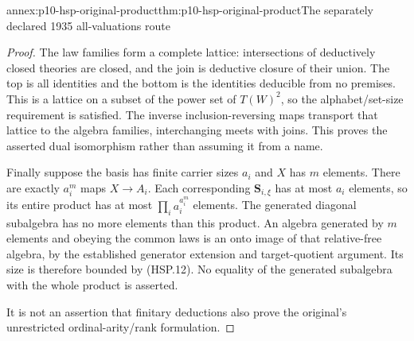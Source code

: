 \begin{annexitem}{annex:p10-hsp-original-product}{thm:p10-hsp-original-product}{The separately declared 1935 all-valuations route}
\begin{proof}
The law families form a complete lattice: intersections
of deductively closed theories are closed, and the
join is deductive closure of their union. The top
is all identities and the bottom is the identities
deducible from no premises. This is a lattice on
a subset of the power set of \(T(W)^2\), so the
alphabet/set-size requirement is satisfied.
The inverse inclusion-reversing maps transport that
lattice to the algebra families, interchanging
meets with joins. This proves the asserted dual
isomorphism rather than assuming it from a name.

Finally suppose the basis has finite carrier sizes
\(a_i\) and \(X\) has \(m\) elements.
There are exactly \(a_i^m\) maps \(X\to A_i\).
Each corresponding \(\mathbf S_{i,\xi}\)
has at most \(a_i\) elements, so its entire product
has at most \(\prod_i a_i^{a_i^m}\) elements.
The generated diagonal subalgebra has no more
elements than this product.
An algebra generated by \(m\) elements and
obeying the common laws is an onto image of that
relative-free algebra, by the established generator
extension and target-quotient argument.
Its size is therefore bounded by (HSP.12).
No equality of the generated subalgebra with the
whole product is asserted.

It is not an assertion that finitary deductions
also prove the original's unrestricted
ordinal-arity/rank formulation.
\end{proof}
\end{annexitem}
